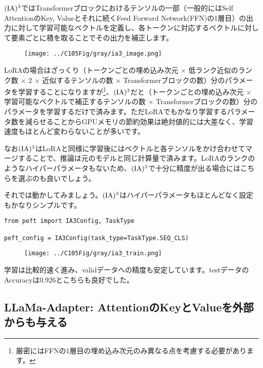 \documentclass[a5paper,twoside,dvipdfmx]{jsarticle}
\begin{document}
$\rm{(IA)^3}$ではTransformerブロックにおけるテンソルの一部（一般的にはSelf AttentionのKey, Valueとそれに続くFeed Forward Network(FFN)の1層目）の出力に対して学習可能なベクトルを定義し、各トークンに対応するベクトルに対して要素ごとに積を取ることでその出力を補正します。


\begin{figure}[h]
  \centering
  \texttt{[image: ../C105Fig/gray/ia3\_image.png]}
 \end{figure} 

LoRAの場合はざっくり（トークンごとの埋め込み次元 $\times$ 低ランク近似のランク数 $\times$ 2 $\times$ 近似するテンソルの数 $\times$ Transformerブロックの数）分のパラメータを学習することになりますが\footnote{厳密にはFFNの1層目の埋め込み次元のみ異なる点を考慮する必要があります。}、$\rm{(IA)^3}$だと（トークンごとの埋め込み次元 $\times$ 学習可能なベクトルで補正するテンソルの数 $\times$ Transformerブロックの数）分のパラメータを学習するだけで済みます。ただLoRAでもかなり学習するパラメータ数を減らせることからGPUメモリの節約効果は絶対値的には大差なく、学習速度もほとんど変わらないことが多いです。

なお$\rm{(IA)^3}$はLoRAと同様に学習後にはベクトルと各テンソルをかけ合わせてマージすることで、推論は元のモデルと同じ計算量で済みます。LoRAのランクのようなハイパーパラメータもないため、$\rm{(IA)^3}$で十分に精度が出る場合にはこちらを選ぶのも良いでしょう。

それでは動かしてみましょう。$\rm{(IA)^3}$はハイパーパラメータもほとんどなく設定もかなりシンプルです。

\begin{lstlisting}
from peft import IA3Config, TaskType
 
peft_config = IA3Config(task_type=TaskType.SEQ_CLS)
\end{lstlisting}


\newpage

\begin{figure}[h]
  \centering
  \texttt{[image: ../C105Fig/gray/ia3\_train.png]}
 \end{figure} 

 
学習は比較的速く進み、validデータへの精度も安定しています。testデータのAccuracyは0.926とこちらも良好でした。


\subsection{LLaMa-Adapter: AttentionのKeyとValueを外部からも与える}
\end{document}
